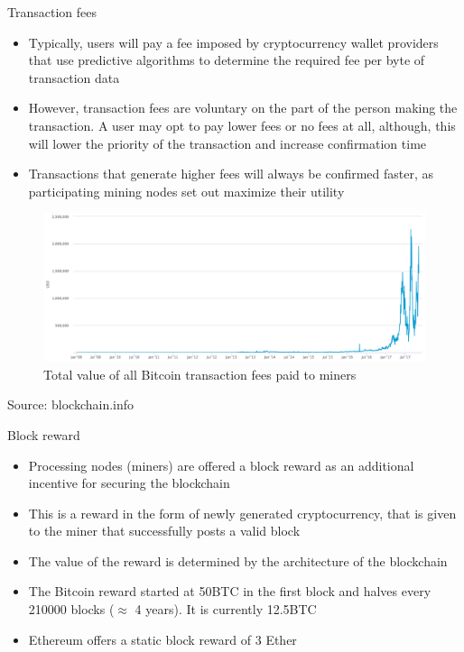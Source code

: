 \documentclass[9pt]{beamer}
\begin{document}
\begin{frame}{Transaction fees}
	\begin{itemize}
		\item Typically, users will pay a fee imposed by cryptocurrency wallet providers that use predictive algorithms to determine the required fee per byte of transaction data
		\item However, transaction fees are voluntary on the part of the person making the transaction. A user may opt to pay lower fees or no fees at all, although, this will lower the priority of the transaction and increase confirmation time
		\item Transactions that generate higher fees will always be confirmed faster, as participating mining nodes set out maximize their utility
	\end{itemize}
\end{frame}


\begin{frame}
	\begin{scriptsize}
	\end{scriptsize}
	\begin{figure}[]
		\centering
		\includegraphics  [scale=0.25]{Images/transaction-fees}
		\caption{	Total value of all Bitcoin transaction fees paid to miners}
	\end{figure}
	\begin{tiny}
		Source: blockchain.info
	\end{tiny}
\end{frame}


\begin{frame}{Block reward}
	\begin{itemize}
		\item Processing nodes (miners) are offered a block reward as an additional incentive for securing the blockchain
		\item This is a reward in the form of newly generated cryptocurrency, that is given to the miner that successfully posts a valid block
		\item The value of the reward is determined by the architecture of the blockchain
		\item The Bitcoin reward started at 50BTC in the first block and halves every 210000 blocks ($\approx$ 4 years). It is currently 12.5BTC
		\item Ethereum offers a static block reward of 3 Ether
	\end{itemize}
\end{frame}
\end{document}
